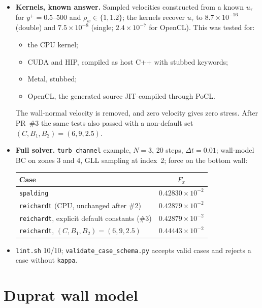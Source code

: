 \documentclass[11pt,a4paper]{article}
\newcommand{\code}[1]{\texttt{#1}}
\newcommand{\utau}{u_\tau}
\begin{document}
\begin{itemize}
  \item \textbf{Kernels, known answer.} Sampled velocities constructed from
    a known $\utau$ for $y^+ = 0.5$--$500$ and $\rho_w\in\{1, 1.2\}$; the
    kernels recover $\utau$ to $8.7\times10^{-16}$ (double) and
    $7.5\times10^{-8}$ (single; $2.4\times10^{-7}$ for OpenCL). This was
    tested for:
    \begin{itemize}
      \item the CPU kernel;
      \item CUDA and HIP, compiled as host C++ with stubbed keywords;
      \item Metal, stubbed;
      \item OpenCL, the generated source JIT-compiled through PoCL.
    \end{itemize}
    The wall-normal velocity is removed, and zero velocity gives zero
    stress. After PR~\#3 the same tests also passed with a non-default set
    $(C, B_1, B_2) = (6, 9, 2.5)$.
  \item \textbf{Full solver.} \code{turb\_channel} example, $N=3$, 20 steps,
    $\Delta t = 0.01$; wall-model BC on zones 3 and 4, GLL sampling at
    index~2; force on the bottom wall:
    \begin{center}
    \small
    \begin{tabular}{lc}
      \toprule
      Case & $F_x$ \\
      \midrule
      \code{spalding} & $0.42830\times10^{-2}$ \\
      \code{reichardt} (CPU, unchanged after \#2) & $0.42879\times10^{-2}$ \\
      \code{reichardt}, explicit default constants (\#3) & $0.42879\times10^{-2}$ \\
      \code{reichardt}, $(C,B_1,B_2) = (6, 9, 2.5)$ & $0.44443\times10^{-2}$ \\
      \bottomrule
    \end{tabular}
    \end{center}
  \item \code{lint.sh} 10/10; \code{validate\_case\_schema.py} accepts valid
    cases and rejects a case without \code{kappa}.
\end{itemize}

\section{Duprat wall model}
\end{document}
